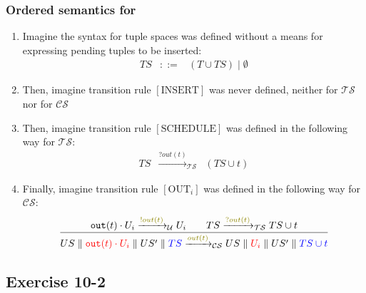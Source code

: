 \documentclass[presentation]{beamer}\mode<presentation>{\usetheme{AMSCesenaPurpleAndGold}}
\begin{document}
\begin{frame}
\frametitle{Ordered semantics for \linda{}}

    \begin{enumerate}
        \item Imagine the syntax for tuple spaces was defined without a means for expressing pending tuples to be inserted:
        \[\begin{array}{rcl}
            TS &::=& (T \cup TS) \mid \emptyset
        \end{array}\]
        
        \vfill
        
        \item Then, imagine transition rule $[\text{INSERT}]$ was never defined, neither for $\mathcal{TS}$ nor for $\mathcal{CS}$
        
        \vfill
        
        \item Then, imagine transition rule $[\text{SCHEDULE}]$ was defined in the following way for $\mathcal{TS}$:
        \[\begin{array}{rcl}
            TS &\xrightarrow{?out(t)}_\mathcal{TS}& (TS \cup t)
        \end{array}\]
        
        \vfill
        
        \item Finally, imagine transition rule $[\text{OUT}_i]$ was defined in the following way for $\mathcal{CS}$:
        \[
            \frac{
                \mathtt{out}(t) \cdot U_i \xrightarrow{\highlightG{!out(t)}}_\mathcal{U} U_i 
                \qquad
                TS \xrightarrow{\highlightG{?out(t)}}_\mathcal{TS} TS \cup t 
            }{
                US \parallel \highlightR{\mathtt{out}(t) \cdot U_i} \parallel US' \parallel \highlightB{TS}
                \xrightarrow{\highlightG{out(t)}}_\mathcal{CS}
                US \parallel \highlightR{U_i} \parallel US' \parallel \highlightB{TS \cup t }
            }
        \]
    \end{enumerate}

\end{frame}

\subsection{Exercise 10-2}
\end{document}
